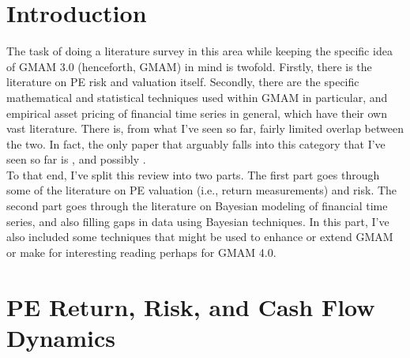 \documentclass[final,5p,times,twocolumn,authoryear]{elsarticle}
\begin{document}
\begin{frontmatter}






\end{frontmatter}



\section{Introduction}
The task of doing a literature survey in this area while keeping the specific idea of GMAM 3.0 (henceforth, GMAM) in mind is twofold. Firstly, there is the literature on PE risk and valuation itself. Secondly, there are the specific mathematical and statistical techniques used within GMAM in particular, and empirical asset pricing of financial time series in general, which have their own vast literature. There is, from what I've seen so far, fairly limited overlap between the two. In fact, the only paper that arguably falls into this category that I've seen so far is \cite{Ang2014}, and possibly \cite{Ang2007}. \\

To that end, I've split this review into two parts. The first part goes through some of the literature on PE valuation (i.e., return measurements) and risk. The second part goes through the literature on Bayesian modeling of financial time series, and also filling gaps in data using Bayesian techniques. In this part, I've also included some techniques that might be used to enhance or extend GMAM or make for interesting reading perhaps for GMAM 4.0. 

\section{PE Return, Risk, and Cash Flow Dynamics}
\end{document}
